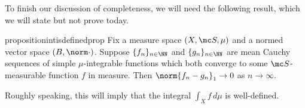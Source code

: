 \documentclass[../notes.tex]{subfiles}
\begin{document}
To finish our discussion of completeness, we will need the following result, which we will state but not prove today.
\begin{restatable}{proposition}{intisdefinedprop} \label{prop:equivalent-mean-cauchy}
	Fix a measure space $(X,\mc S,\mu)$ and a normed vector space $(B,\norm\cdot)$. Suppose $\{f_n\}_{n\in\NN}$ and $\{g_n\}_{n\in\NN}$ are mean Cauchy sequences of simple $\mu$-integrable functions which both converge to some $\mc S$-measurable function $f$ in measure. Then $\norm{f_n-g_n}_1\to0$ as $n\to\infty$.
\end{restatable}
\noindent Roughly speaking, this will imply that the integral $\int_Xf\,d\mu$ is well-defined.
\end{document}
